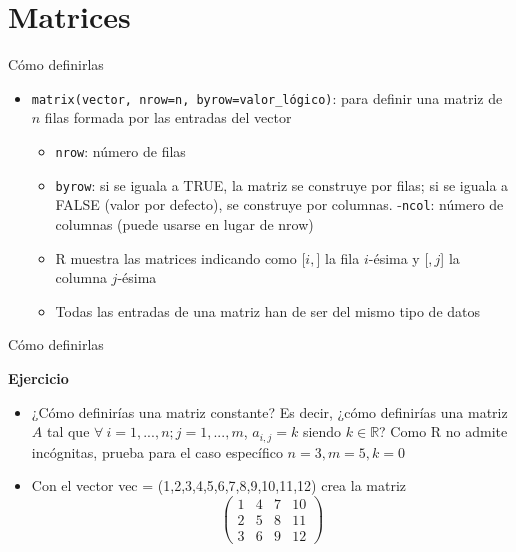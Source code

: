 \documentclass[
  ignorenonframetext,
]{beamer}
\providecommand{\tightlist}{%
  \setlength{\itemsep}{0pt}\setlength{\parskip}{0pt}}
\begin{document}
\hypertarget{matrices}{%
\section{Matrices}\label{matrices}}

\begin{frame}[fragile]{Cómo definirlas}
\protect\hypertarget{cuxf3mo-definirlas}{}

\begin{itemize}
\tightlist
\item
  \texttt{matrix(vector,\ nrow=n,\ byrow=valor\_lógico)}: para definir
  una matriz de \(n\) filas formada por las entradas del vector

  \begin{itemize}
  \tightlist
  \item
    \texttt{nrow}: número de filas
  \item
    \texttt{byrow}: si se iguala a TRUE, la matriz se construye por
    filas; si se iguala a FALSE (valor por defecto), se construye por
    columnas. -\texttt{ncol}: número de columnas (puede usarse en lugar
    de nrow)
  \item
    R muestra las matrices indicando como {[}\(i,\){]} la fila
    \(i\)-ésima y {[}\(,j\){]} la columna \(j\)-ésima
  \item
    Todas las entradas de una matriz han de ser del mismo tipo de datos
  \end{itemize}
\end{itemize}

\end{frame}

\begin{frame}{Cómo definirlas}
\protect\hypertarget{cuxf3mo-definirlas-1}{}

\textbf{Ejercicio}

\begin{itemize}
\item
  ¿Cómo definirías una matriz constante? Es decir, ¿cómo definirías una
  matriz \(A\) tal que \(\forall\  i=1,...,n; j = 1,...,m\),
  \(a_{i,j}=k\) siendo \(k\in\mathbb{R}\)? Como R no admite incógnitas,
  prueba para el caso específico \(n = 3, m = 5, k = 0\) 
\item
  Con el vector vec = (1,2,3,4,5,6,7,8,9,10,11,12) crea la matriz
  \[\begin{pmatrix}
  1 & 4 & 7 & 10\\
  2 & 5 & 8 & 11\\
  3 & 6 & 9 & 12
  \end{pmatrix}\] 
\end{itemize}

\end{frame}
\end{document}
